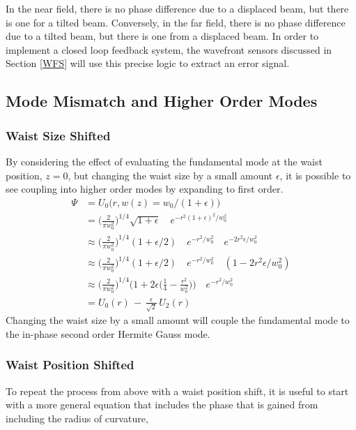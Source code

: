 \documentclass[oneside]{book}
\begin{document}
		In the near field, there is no phase difference due to a displaced beam, but there is one for a tilted beam.  Conversely, in the far field, there is no phase difference due to a tilted beam, but there is one from a displaced beam.  In order to implement a closed loop feedback system, the wavefront sensors discussed in Section \ref{WFS} will use this precise logic to extract an error signal.
		
		
		\subsection{Mode Mismatch and Higher Order Modes}\label{Modemismatch}
		
		
		\subsubsection{Waist Size Shifted}
		By considering the effect of evaluating the fundamental mode at the waist position, $z=0$, but changing the waist size by a small amount $\epsilon$, it is possible to see coupling into higher order modes by expanding to first order.	
		\begin{equation}
		\begin{aligned}
		\Psi 	&=  		U_{0} \big(r,w(z) = w_0/(1+\epsilon) \big) 
		\\		&= 			\bigg( \frac{2}{\pi w_0^2} \bigg)^{1/4} \sqrt{1 + \epsilon} \quad e^{-r^2 (1+\epsilon)^2/w_0^2 }
		\\		&\approx 	\bigg( \frac{2}{\pi w_0^2} \bigg)^{1/4} (1 + \epsilon /2) \quad e^{-r^2/w_0^2} \quad e^{-2r^2\epsilon/w_0^2} 
		\\		&\approx 	\bigg( \frac{2}{\pi w_0^2} \bigg)^{1/4} (1 + \epsilon /2) \quad e^{-r^2/w_0^2} \quad (1-2r^2\epsilon/w_0^2)
		\\		&\approx 	\bigg( \frac{2}{\pi w_0^2} \bigg)^{1/4} \bigg(1+ 2\epsilon\bigg(\frac{1}{4} - \frac{r^2}{w_0^2}\bigg) \bigg ) \quad e^{-r^2/w_0^2}	
		\\		&=			U_0(r) \, - \, \frac{\epsilon}{\sqrt{2}} \, U_2(r)
		\end{aligned}
		\end{equation}
		Changing the waist size by a small amount will couple the fundamental mode to the in-phase second order Hermite Gauss mode.
		
		\subsubsection{Waist Position Shifted}
		To repeat the process from above with a waist position shift, it is useful to start with a more general equation that includes the phase that is gained from including the radius of curvature,
		
\end{document}
